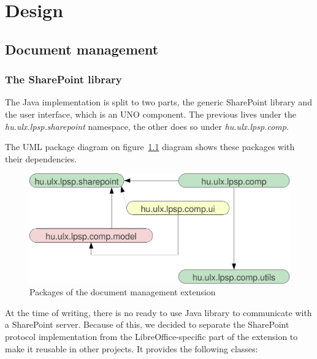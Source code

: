 \chapter{Design}

\section{Document management}

\subsection{The SharePoint library}

The Java implementation is split to two parts, the generic SharePoint library
and the user interface, which is an UNO component. The previous lives under the
\emph{hu.ulx.lpsp.sharepoint} namespace, the other does so under
\emph{hu.ulx.lpsp.comp}.

The UML package diagram on figure~\ref{fig:design-packages} diagram shows these
packages with their dependencies.

\begin{figure}[H]
\centering
\includegraphics[width=425px,keepaspectratio]{design-packages.pdf}
\caption{Packages of the document management extension}
\label{fig:design-packages}
\end{figure}

At the time of writing, there is no ready to use Java library to communicate
with a SharePoint server. Because of this, we decided to separate the SharePoint
protocol implementation from the LibreOffice-specific part of the extension to
make it reusable in other projects. It provides the following classes:

